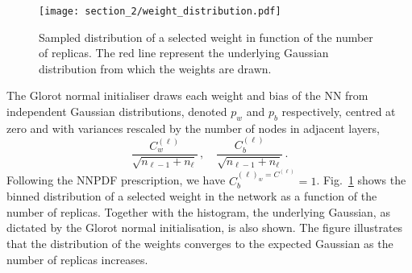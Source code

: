\begin{figure}[t!]
  \centering
  \texttt{[image: section\_2/weight\_distribution.pdf]}
  \caption{Sampled distribution of a selected weight in function of the
  number of replicas. The red line represent the underlying Gaussian distribution
  from which the weights are drawn.}
  \label{fig:weight_distribution}
\end{figure}
The Glorot normal initialiser draws each weight and bias of the NN from independent Gaussian
distributions, denoted $p_w$ and $p_b$ respectively, centred at zero and with variances
rescaled by the number of nodes in adjacent layers,
\begin{equation}
    \label{eq:RescaledGlorotVariances}
    \frac{C^{(\ell)}_{w}}{\sqrt{n_{\ell-1} + n_{\ell}}}\, ,
    \quad \frac{C^{(\ell)}_{b}}{\sqrt{n_{\ell-1} + n_{\ell}}}\, .
\end{equation}
Following the NNPDF prescription, we have $C^{(\ell)_{w}=C^(\ell)}_{b}=1$.
Fig.~\ref{fig:weight_distribution} shows the binned distribution of a selected
weight in the network as a function of the number of replicas. Together with the
histogram, the underlying Gaussian, as dictated by the Glorot normal
initialisation, is also shown. The figure illustrates that the distribution of
the weights converges to the expected Gaussian as the number of replicas increases.

